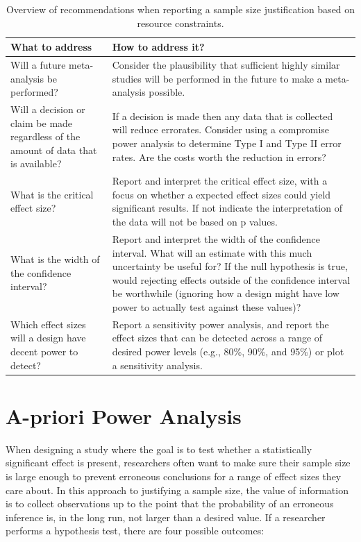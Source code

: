 \documentclass[
  oneside]{book}
\begin{document}
\begin{table}

\caption{\label{tab:table-pow-rec}Overview of recommendations when reporting a sample size justification based on resource constraints.}
\centering
\begin{tabular}[t]{l|l}
\hline
What to address & How to address it?\\
\hline
Will a future meta-analysis be performed? & Consider the plausibility that sufficient highly similar studies will be performed in the future to make a meta-analysis possible.\\
\hline
Will a decision or claim be made regardless of the amount of data that is available? & If a decision is made then any data that is collected will reduce errorates. Consider using a compromise power analysis to determine Type I and Type II error rates. Are the costs worth the reduction in errors?\\
\hline
What is the critical effect size? & Report and interpret the critical effect size, with a focus on whether a expected effect sizes could yield significant results. If not indicate the interpretation of the data will not be based on p values.\\
\hline
What is the width of the confidence interval? & Report and interpret the width of the confidence interval. What will an estimate with this much uncertainty be useful for? If the null hypothesis is true, would rejecting effects outside of the confidence interval be worthwhile (ignoring how a design might have low power to actually test against these values)?\\
\hline
Which effect sizes will a design have decent power to detect? & Report a sensitivity power analysis, and report the effect sizes that can be detected across a range of desired power levels (e.g., 80\%, 90\%, and 95\%) or plot a sensitivity analysis.\\
\hline
\end{tabular}
\end{table}

\hypertarget{a-priori-power-analysis}{%
\section{A-priori Power Analysis}\label{a-priori-power-analysis}}

When designing a study where the goal is to test whether a statistically significant effect is present, researchers often want to make sure their sample size is large enough to prevent erroneous conclusions for a range of effect sizes they care about. In this approach to justifying a sample size, the value of information is to collect observations up to the point that the probability of an erroneous inference is, in the long run, not larger than a desired value. If a researcher performs a hypothesis test, there are four possible outcomes:
\end{document}
